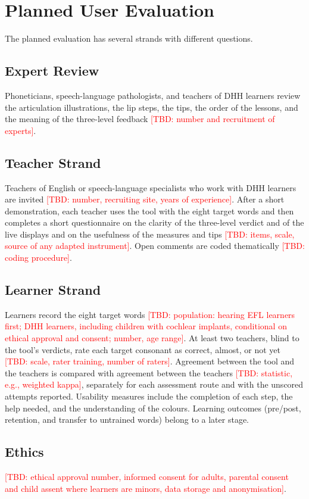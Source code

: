 \documentclass[conference]{IEEEtran}
\newcommand{\tbd}[1]{\textcolor{red}{[TBD: #1]}}
\begin{document}
\section{Planned User Evaluation}
The planned evaluation has several strands with different questions.

\subsection{Expert Review}
Phoneticians, speech-language pathologists, and teachers of DHH learners review the articulation illustrations, the lip steps, the tips, the order of the lessons, and the meaning of the three-level feedback \tbd{number and recruitment of experts}.

\subsection{Teacher Strand}
Teachers of English or speech-language specialists who work with DHH learners are invited \tbd{number, recruiting site, years of experience}. After a short demonstration, each teacher uses the tool with the eight target words and then completes a short questionnaire on the clarity of the three-level verdict and of the live displays and on the usefulness of the measures and tips \tbd{items, scale, source of any adapted instrument}. Open comments are coded thematically \tbd{coding procedure}.

\subsection{Learner Strand}
Learners record the eight target words \tbd{population: hearing EFL learners first; DHH learners, including children with cochlear implants, conditional on ethical approval and consent; number, age range}. At least two teachers, blind to the tool's verdicts, rate each target consonant as correct, almost, or not yet \tbd{scale, rater training, number of raters}. Agreement between the tool and the teachers is compared with agreement between the teachers \tbd{statistic, e.g., weighted kappa}, separately for each assessment route and with the unscored attempts reported. Usability measures include the completion of each step, the help needed, and the understanding of the colours. Learning outcomes (pre/post, retention, and transfer to untrained words) belong to a later stage.

\subsection{Ethics}
\tbd{ethical approval number, informed consent for adults, parental consent and child assent where learners are minors, data storage and anonymisation}.
\end{document}
